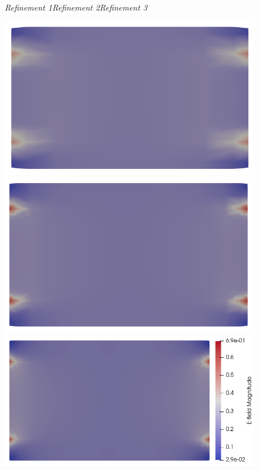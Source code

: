 \documentclass{article}
\begin{document}
\begin{figure}
    \centering
    \textit{\textsf{Refinement 1\hspace{2.5cm}Refinement 2\hspace{2.5cm}Refinement 3\hspace{1cm}}}
    
    \includegraphics[scale=0.27]{slice_E_T-1_lambda-0_8-2-2.png}
    \includegraphics[scale=0.27]{slice_E_T-1_lambda-0_16-3-3.png}
    \includegraphics[scale=0.27]{slice_E_T-1_lambda-0_32-3-4.png}

\end{figure}
\end{document}
